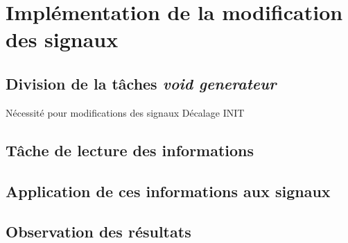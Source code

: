 \section{Implémentation de la modification des signaux}

\subsection{Division de la tâches \emph{void generateur}}	
Nécessité pour modifications des signaux
Décalage INIT

\subsection{Tâche de lecture des informations}

\subsection{Application de ces informations aux signaux}

\subsection{Observation des résultats}